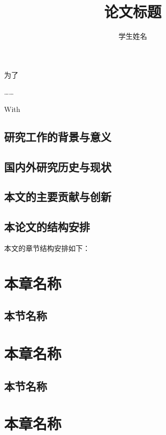 \documentclass[master]{thesis-swufe}
\title{论文标题}
\author{学生姓名}
\begin{document}
\makecover

\begin{chineseabstract}
为了

……

\end{chineseabstract}

\begin{englishabstract}
With

\end{englishabstract}

\thesistableofcontents

\thesischapterexordium

\section{研究工作的背景与意义}


\section{国内外研究历史与现状}


\section{本文的主要贡献与创新}


\section{本论文的结构安排}
本文的章节结构安排如下：

\chapter{本章名称}


\section{本节名称}

\chapter{本章名称}


\section{本节名称}

\chapter{本章名称}
\end{document}
